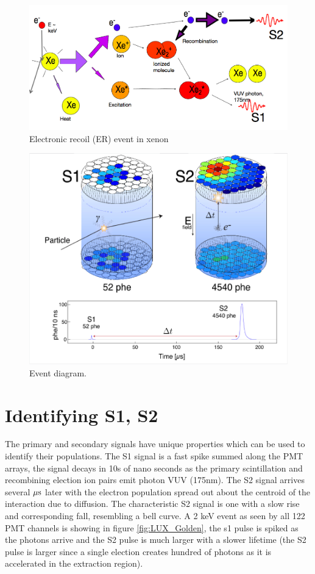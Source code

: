  \begin{figure}[h!]\centering
\includegraphics[width=150mm]{Chapter_LUX_Det/ER_T_Shutt.png}
\caption{Electronic recoil (ER) event in xenon}
\label{fig:TomS_NR}
\end{figure}

 \begin{figure}[h!]\centering
\includegraphics[width=150mm]{Chapter_LUX_Det/LUX_Event_Diagram.png}
\caption{Event diagram.}
\label{fig:LUX_Event}
\end{figure}

\section{Identifying S1, S2}
The primary and secondary signals have unique properties which can be used to identify their populations. The S1 signal is a fast spike summed along the PMT arrays, the signal decays in 10s of nano seconds as the primary scintillation and recombining election ion pairs emit photon VUV (175nm). The S2 signal arrives several $\rm \mu s$ later with the electron population spread out about the centroid of the interaction due to diffusion. The characteristic S2 signal is one with a slow rise and corresponding fall, resembling a bell curve. A 2 keV event as seen by all 122 PMT channels is showing in figure \ref{fig:LUX_Golden}, the s1 pulse is spiked as the photons arrive and the S2 pulse is much larger with a slower lifetime (the S2 pulse is larger since a single election creates hundred of photons as it is accelerated in the extraction region). 

